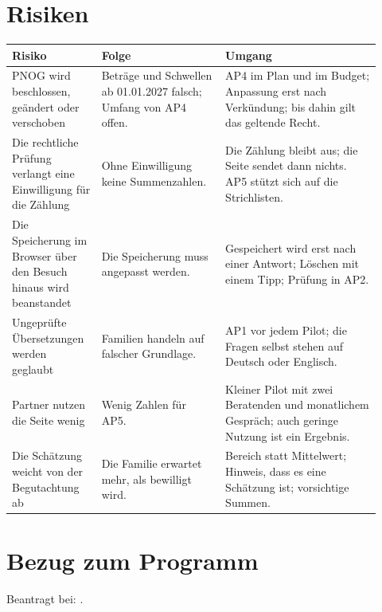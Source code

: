 \documentclass[11pt,a4paper,parskip=half-]{scrartcl}
\begin{document}
\section{Risiken}
\begingroup\small
\begin{longtable}{@{}L{0.22\linewidth}L{0.31\linewidth}L{0.39\linewidth}@{}}
\toprule
\textbf{Risiko} & \textbf{Folge} & \textbf{Umgang} \\
\midrule
\endhead
PNOG wird beschlossen, geändert oder verschoben & Beträge und Schwellen ab 01.01.2027 falsch; Umfang von AP4 offen. &
  AP4 im Plan und im Budget; Anpassung erst nach Verkündung; bis dahin gilt das geltende Recht. \\
Die rechtliche Prüfung verlangt eine Einwilligung für die Zählung & Ohne Einwilligung keine Summenzahlen. &
  Die Zählung bleibt aus; die Seite sendet dann nichts. AP5 stützt sich auf die Strichlisten. \\
Die Speicherung im Browser über den Besuch hinaus wird beanstandet & Die Speicherung muss angepasst werden. &
  Gespeichert wird erst nach einer Antwort; Löschen mit einem Tipp; Prüfung in AP2. \\
Ungeprüfte Übersetzungen werden geglaubt & Familien handeln auf falscher Grundlage. &
  AP1 vor jedem Pilot; die Fragen selbst stehen auf Deutsch oder Englisch. \\
Partner nutzen die Seite wenig & Wenig Zahlen für AP5. &
  Kleiner Pilot mit zwei Beratenden und monatlichem Gespräch; auch geringe Nutzung ist ein Ergebnis. \\
Die Schätzung weicht von der Begutachtung ab & Die Familie erwartet mehr, als bewilligt wird. &
  Bereich statt Mittelwert; Hinweis, dass es eine Schätzung ist; vorsichtige Summen. \\
\bottomrule
\end{longtable}
\endgroup

\section{Bezug zum Programm}
Beantragt bei: .
\end{document}
